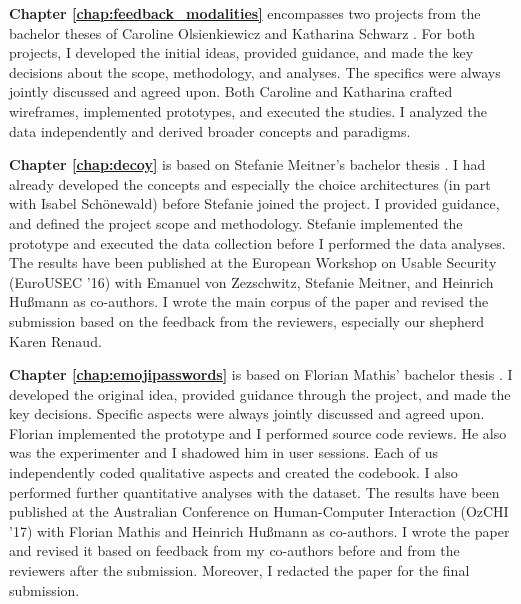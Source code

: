 \textbf{Chapter \ref{chap:feedback_modalities}} encompasses two projects from the bachelor theses of Caroline Olsienkiewicz \cite{Olsienkiewicz2016BAThesis} and Katharina Schwarz \cite{Schwarz2016BAThesis}. For both projects, I developed the initial ideas, provided guidance, and made the key decisions about the scope, methodology, and analyses. The specifics were always jointly discussed and agreed upon. Both Caroline and Katharina crafted wireframes, implemented prototypes, and executed the studies. I analyzed the data independently and derived broader concepts and paradigms. 

\textbf{Chapter \ref{chap:decoy}} is based on Stefanie Meitner's bachelor thesis \cite{Meitner2016BADecoy}. I had already developed the concepts and especially the choice architectures (in part with Isabel Schönewald) before Stefanie joined the project. I provided guidance, and defined the project scope and methodology. Stefanie implemented the prototype and executed the data collection before I performed the data analyses. The results have been published at the European Workshop on Usable Security (EuroUSEC '16) with Emanuel von Zezschwitz, Stefanie Meitner, and Heinrich Hußmann as co-authors. I wrote the main corpus of the paper and revised the submission based on the feedback from the reviewers, especially our shepherd Karen Renaud. 

\textbf{Chapter \ref{chap:emojipasswords}} is based on Florian Mathis' bachelor thesis \cite{Mathis2017BA}. I developed the original idea, provided guidance through the project, and made the key decisions. Specific aspects were always jointly discussed and agreed upon. Florian implemented the prototype and I performed source code reviews. He also was the experimenter and I shadowed him in user sessions. Each of us independently coded qualitative aspects and created the codebook. I also performed further quantitative analyses with the dataset. The results have been published at the Australian Conference on Human-Computer Interaction (OzCHI '17) with Florian Mathis and Heinrich Hußmann as co-authors. I wrote the paper and revised it based on feedback from my co-authors before and from the reviewers after the submission. Moreover, I redacted the paper for the final submission. 
